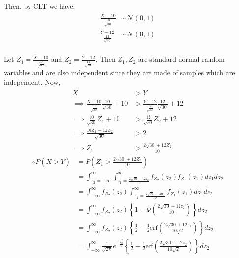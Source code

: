 \documentclass[12pt, oneside]{article}
\begin{document}
\begin{enumerate}
{  Then, by CLT we have:
  \begin{align*}
    \frac{\overline{X} - 10}{\frac{10}{\sqrt{30}}} &\sim \mathcal{N}(0, 1) \\
    \frac{\overline{Y} - 12}{\frac{12}{\sqrt{30}}} &\sim \mathcal{N}(0, 1) \\
  \end{align*}

  Let \(Z_1 = \frac{\overline{X} - 10}{\frac{10}{\sqrt{30}}}\) and \(Z_2 = \frac{\overline{Y} - 12}{\frac{12}{\sqrt{30}}}\).
  Then \(Z_1, Z_2\) are standard normal random variables and are also independent since
  they are made of samples which are independent. Now,
  \begin{align*}
    \overline{X} &> \overline{Y} \\
    \implies \frac{\overline{X} - 10}{\frac{10}{\sqrt{30}}} \frac{10}{\sqrt{30}} + 10 &> \frac{\overline{Y} - 12}{\frac{12}{\sqrt{30}}} \frac{12}{\sqrt{30}} + 12 \\
    \implies {\frac{10}{\sqrt{30}}} Z_1 + 10 &> \frac{12}{\sqrt{30}} Z_2 + 12 \\
    \implies \frac{10Z_1 - 12Z_2}{\sqrt{30}} &> 2 \\
    \implies Z_1 &> \frac{2\sqrt{30} + 12Z_2}{10}
  \end{align*}
  \begin{align*}
    \therefore P(\overline{X} > \overline{Y}) &= P\left(Z_1 > \frac{2\sqrt{30} + 12Z_2}{10}\right) \\
      &= \int_{z_2=-\infty}^{\infty} \int_{z_1 = \frac{2\sqrt{30} + 12z_2}{10}}^{\infty} f_{Z_2}(z_2) f_{Z_1}(z_1) dz_1 dz_2 \\
      &= \int_{-\infty}^{\infty} f_{Z_2}(z_2) \int_{z_1 = \frac{2\sqrt{30} + 12z_2}{10}}^{\infty}  f_{Z_1}(z_1) dz_1 dz_2 \\
      &= \int_{-\infty}^{\infty} f_{Z_2}(z_2) \left\{1 - \Phi\left(\frac{2\sqrt{30} + 12z_2}{10}\right)\right\} dz_2 \tag*{(where \(\Phi\) is the standard normal CDF)} \\
      &= \int_{-\infty}^{\infty} f_{Z_2}(z_2) \left\{\frac{1}{2} - \frac{1}{2}\text{erf}\left(\frac{2\sqrt{30} + 12z_2}{10\sqrt{2}}\right)\right\} dz_2
          \tag*{(Where erf is the Gauss error function)} \\
      &= \int_{-\infty}^{\infty} \frac{1}{\sqrt{2\pi}} e^{-\frac{z_2^2}{2}} \left\{\frac{1}{2} - \frac{1}{2}\text{erf}\left(\frac{2\sqrt{30} + 12z_2}{10\sqrt{2}}\right)\right\} dz_2
  \end{align*}

}
\end{enumerate}
\end{document}
